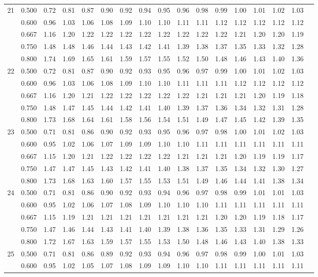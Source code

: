 \documentclass[pdftex,11pt,openany]{book}\usepackage[]{graphicx}\usepackage[]{color}
\begin{document}
{\begin{center}
\begin{tabular}{rrr@{\,}r@{\,}r@{\,}r@{\,}r@{\,}r@{\,}r@{\,}r
                   @{\,}r@{\,}r@{\,}r@{\,}r@{\,}r@{\,}r@{\,}r}
21&0.500&0.72&0.81&0.87&0.90&0.92&0.94&0.95&0.96&0.98&0.99&1.00&1.01&1.02&1.03\\
  &0.600&0.96&1.03&1.06&1.08&1.09&1.10&1.10&1.11&1.11&1.12&1.12&1.12&1.12&1.12\\
  &0.667&1.16&1.20&1.22&1.22&1.22&1.22&1.22&1.22&1.22&1.22&1.21&1.20&1.20&1.19\\
  &0.750&1.48&1.48&1.46&1.44&1.43&1.42&1.41&1.39&1.38&1.37&1.35&1.33&1.32&1.28\\
  &0.800&1.74&1.69&1.65&1.61&1.59&1.57&1.55&1.52&1.50&1.48&1.46&1.43&1.40&1.36\\
22&0.500&0.72&0.81&0.87&0.90&0.92&0.93&0.95&0.96&0.97&0.99&1.00&1.01&1.02&1.03\\
  &0.600&0.96&1.03&1.06&1.08&1.09&1.10&1.10&1.11&1.11&1.11&1.12&1.12&1.12&1.12\\
  &0.667&1.16&1.20&1.21&1.22&1.22&1.22&1.22&1.22&1.21&1.21&1.21&1.20&1.19&1.18\\
  &0.750&1.48&1.47&1.45&1.44&1.42&1.41&1.40&1.39&1.37&1.36&1.34&1.32&1.31&1.28\\
  &0.800&1.73&1.68&1.64&1.61&1.58&1.56&1.54&1.51&1.49&1.47&1.45&1.42&1.39&1.35\\
23&0.500&0.71&0.81&0.86&0.90&0.92&0.93&0.95&0.96&0.97&0.98&1.00&1.01&1.02&1.03\\
  &0.600&0.95&1.02&1.06&1.07&1.09&1.09&1.10&1.10&1.11&1.11&1.11&1.11&1.11&1.11\\
  &0.667&1.15&1.20&1.21&1.22&1.22&1.22&1.22&1.21&1.21&1.21&1.20&1.19&1.19&1.17\\
  &0.750&1.47&1.47&1.45&1.43&1.42&1.41&1.40&1.38&1.37&1.35&1.34&1.32&1.30&1.27\\
  &0.800&1.73&1.68&1.63&1.60&1.57&1.55&1.53&1.51&1.49&1.46&1.44&1.41&1.38&1.34\\
24&0.500&0.71&0.81&0.86&0.90&0.92&0.93&0.94&0.96&0.97&0.98&0.99&1.01&1.01&1.03\\
  &0.600&0.95&1.02&1.06&1.07&1.08&1.09&1.10&1.10&1.10&1.11&1.11&1.11&1.11&1.11\\
  &0.667&1.15&1.19&1.21&1.21&1.21&1.21&1.21&1.21&1.21&1.20&1.20&1.19&1.18&1.17\\
  &0.750&1.47&1.46&1.44&1.43&1.41&1.40&1.39&1.38&1.36&1.35&1.33&1.31&1.29&1.26\\
  &0.800&1.72&1.67&1.63&1.59&1.57&1.55&1.53&1.50&1.48&1.46&1.43&1.40&1.38&1.33\\
25&0.500&0.71&0.81&0.86&0.89&0.92&0.93&0.94&0.96&0.97&0.98&0.99&1.00&1.01&1.03\\
  &0.600&0.95&1.02&1.05&1.07&1.08&1.09&1.09&1.10&1.10&1.11&1.11&1.11&1.11&1.11\\

\end{tabular}
\end{center}}
\end{document}
